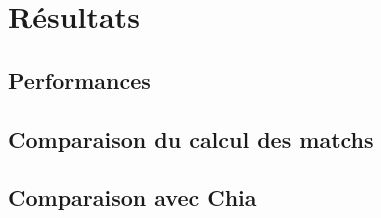 \section{Résultats}

\lipsum[1]

\subsection{Performances}

\lipsum[1]

\subsection{Comparaison du calcul des matchs}

\lipsum[1]

\subsection{Comparaison avec Chia}

\lipsum[1]